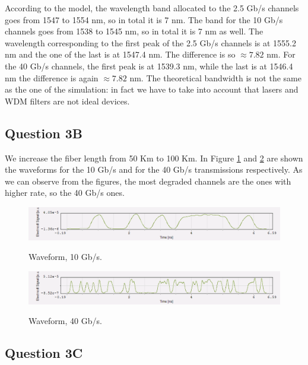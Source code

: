 \documentclass[a4paper,10pt]{report}
\begin{document}
According to the model, the wavelength band allocated to the 2.5 Gb/s channels goes from 1547 to 1554 nm, so in total it is
7 nm. The band for the 10 Gb/s channels goes from 1538 to 1545 nm, so in total it is 7 nm as well.
The wavelength corresponding to the first peak of the 2.5 Gb/s channels is at 1555.2 nm and the one of the last is at 1547.4 nm.
The difference is so $\approx 7.82$ nm.
For the 40 Gb/s channels, the first peak is at 1539.3 nm, while the last is at 1546.4 nm the difference is again $\approx 7.82$ nm.
The theoretical bandwidth is not the same as the one of the simulation: in fact we have to take into account that lasers and WDM filters
are not ideal devices.

\subsection*{Question 3B}

We increase the fiber length from 50 Km to 100 Km. In Figure \ref{q3b_1} and \ref{q3b_2} are shown the waveforms
for the 10 Gb/s and for the 40 Gb/s transmissions respectively.
As we can observe from the figures, the most degraded channels are the ones with higher rate, so the 40 Gb/s ones.


\begin{figure}[!ht]
   \centering
   \includegraphics[width=12cm]{q3b_1.png}\\
   \caption{Waveform, 10 Gb/s.}
   \label{q3b_1}
\end{figure}


\begin{figure}[!ht]
   \centering
   \includegraphics[width=12cm]{q3b_2.png}\\
   \caption{Waveform, 40 Gb/s.}
   \label{q3b_2}
\end{figure}


\subsection*{Question 3C}
\end{document}
